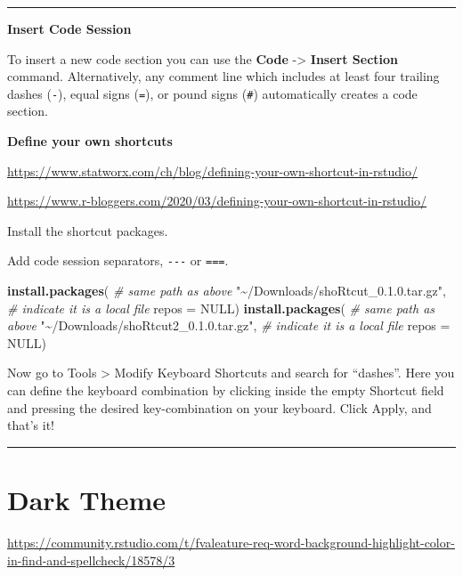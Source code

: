 \documentclass[
]{book}
\newenvironment{Shaded}{\begin{snugshade}}{\end{snugshade}}
\newcommand{\AttributeTok}[1]{\textcolor[rgb]{0.13,0.29,0.53}{#1}}
\newcommand{\CommentTok}[1]{\textcolor[rgb]{0.56,0.35,0.01}{\textit{#1}}}
\newcommand{\ConstantTok}[1]{\textcolor[rgb]{0.56,0.35,0.01}{#1}}
\newcommand{\FunctionTok}[1]{\textcolor[rgb]{0.13,0.29,0.53}{\textbf{#1}}}
\newcommand{\NormalTok}[1]{#1}
\newcommand{\StringTok}[1]{\textcolor[rgb]{0.31,0.60,0.02}{#1}}
\begin{document}
\begin{center}\rule{0.5\linewidth}{0.5pt}\end{center}

\textbf{Insert Code Session}

To insert a new code section you can use the \textbf{Code} -\textgreater{} \textbf{Insert Section} command. Alternatively, any comment line which includes at least four trailing dashes (\texttt{-}), equal signs (\texttt{=}), or pound signs (\texttt{\#}) automatically creates a code section.

\textbf{Define your own shortcuts}

\url{https://www.statworx.com/ch/blog/defining-your-own-shortcut-in-rstudio/}

\url{https://www.r-bloggers.com/2020/03/defining-your-own-shortcut-in-rstudio/}

Install the shortcut packages.

Add code session separators, \texttt{-\/-\/-} or \texttt{===}.

\begin{Shaded}
\begin{Highlighting}[]
\FunctionTok{install.packages}\NormalTok{(}
    \CommentTok{\# same path as above}
  \StringTok{"\textasciitilde{}/Downloads/shoRtcut\_0.1.0.tar.gz"}\NormalTok{, }
  \CommentTok{\# indicate it is a local file}
  \AttributeTok{repos =} \ConstantTok{NULL}\NormalTok{)}
\FunctionTok{install.packages}\NormalTok{(}
    \CommentTok{\# same path as above}
  \StringTok{"\textasciitilde{}/Downloads/shoRtcut2\_0.1.0.tar.gz"}\NormalTok{, }
  \CommentTok{\# indicate it is a local file}
  \AttributeTok{repos =} \ConstantTok{NULL}\NormalTok{)}
\end{Highlighting}
\end{Shaded}

Now go to Tools \textgreater{} Modify Keyboard Shortcuts and search for ``dashes''. Here you can define the keyboard combination by clicking inside the empty Shortcut field and pressing the desired key-combination on your keyboard. Click Apply, and that's it!

\begin{center}\rule{0.5\linewidth}{0.5pt}\end{center}

\section{Dark Theme}\label{dark-theme}

\url{https://community.rstudio.com/t/fvaleature-req-word-background-highlight-color-in-find-and-spellcheck/18578/3}
\end{document}
